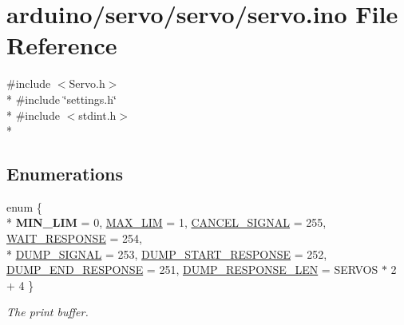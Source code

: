 \hypertarget{servo_8ino}{}\section{arduino/servo/servo/servo.ino File Reference}
\label{servo_8ino}
{\ttfamily \#include $<$Servo.\+h$>$}\\*
{\ttfamily \#include \char`\"{}settings.\+h\char`\"{}}\\*
{\ttfamily \#include $<$stdint.\+h$>$}\\*
\subsection*{Enumerations}
\begin{DoxyCompactItemize}
\item 
enum \{ \\*
{\bfseries M\+I\+N\+\_\+\+L\+I\+M} = 0, 
\hyperlink{servo_8ino_a06fc87d81c62e9abb8790b6e5713c55ba28384d7634c7976556d681b53a81e140}{M\+A\+X\+\_\+\+L\+I\+M} = 1, 
\hyperlink{servo_8ino_a06fc87d81c62e9abb8790b6e5713c55bac997ff2715ad695454398a53eeed31cc}{C\+A\+N\+C\+E\+L\+\_\+\+S\+I\+G\+N\+A\+L} = 255, 
\hyperlink{servo_8ino_a06fc87d81c62e9abb8790b6e5713c55bac22157b3832ba05308923fb860925d68}{W\+A\+I\+T\+\_\+\+R\+E\+S\+P\+O\+N\+S\+E} = 254, 
\\*
\hyperlink{servo_8ino_a06fc87d81c62e9abb8790b6e5713c55ba31cd671c80d04a4acc2d8256ec960c90}{D\+U\+M\+P\+\_\+\+S\+I\+G\+N\+A\+L} = 253, 
\hyperlink{servo_8ino_a06fc87d81c62e9abb8790b6e5713c55ba51975080564db9aa29bff29cce328b5f}{D\+U\+M\+P\+\_\+\+S\+T\+A\+R\+T\+\_\+\+R\+E\+S\+P\+O\+N\+S\+E} = 252, 
\hyperlink{servo_8ino_a06fc87d81c62e9abb8790b6e5713c55baa7ca295335eb71b345d3b0bd0e53277e}{D\+U\+M\+P\+\_\+\+E\+N\+D\+\_\+\+R\+E\+S\+P\+O\+N\+S\+E} = 251, 
\hyperlink{servo_8ino_a06fc87d81c62e9abb8790b6e5713c55baebe1616f434c26e10f088aebf559d708}{D\+U\+M\+P\+\_\+\+R\+E\+S\+P\+O\+N\+S\+E\+\_\+\+L\+E\+N} = S\+E\+R\+V\+O\+S $\ast$ 2 + 4
 \}
\begin{DoxyCompactList}\small\item\em The print buffer. \end{DoxyCompactList}\end{DoxyCompactItemize}

